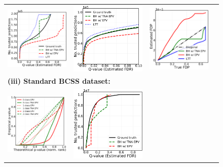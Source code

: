 \documentclass{article}
\begin{document}
\begin{figure}[h!]
\begin{tabular}{cccc}
		\includegraphics[width=1.7in]{img/cnn_cells_balanced_fdr_control.png} & 
		\includegraphics[width=1.7in]{img/cnn_cells_balanced_fdr_control_loc.png} & 
		\includegraphics[width=1.7in]{img/cnn_FDPscat_cells_balanced.png}\\			
		\multicolumn{4}{l}{\bf (iii) Standard BCSS dataset:}\\		
		\includegraphics[width=1.7in]{img/cnn_QQ_multi_sa_bcss.png} &
		\includegraphics[width=2in]{img/cnn_multi_sa_bcss_fdr_control.png} &

\end{tabular}
\end{figure}
\end{document}
